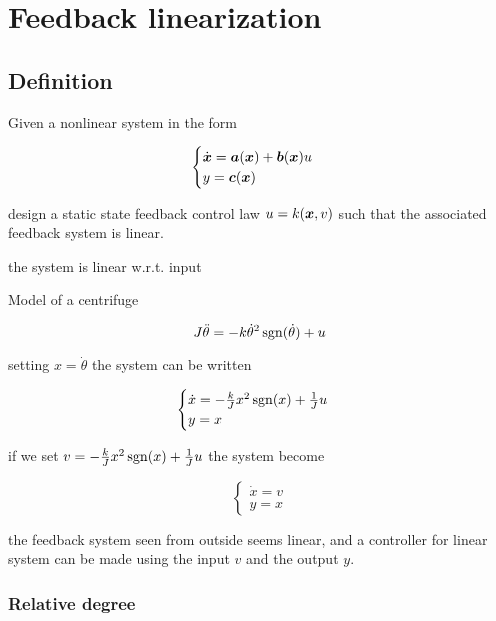 \usepackage{amsmath}\usepackage{amsmath}\chapter{Feedback linearization}

\section{Definition}

Given a nonlinear system in the form

\[
    \begin{cases}
        \dot{\boldsymbol{x}} =\boldsymbol{a}(\boldsymbol{x}) + \boldsymbol{b}(\boldsymbol{x}) u \\
        y = \boldsymbol{c}(\boldsymbol{x})
    \end{cases}
\]

design a static state feedback control law $u = k(\boldsymbol{x},v)$ such that the associated feedback system is linear.

\begin{nb} the system is linear w.r.t. input \end{nb}

\begin{example}
    Model of a centrifuge

    \[
        J \ddot\theta = -k \dot \theta^2 \operatorname{sgn}(\dot \theta) + u
    \]

    setting $x = \dot\theta$ the system can be written

    \[
    \begin{cases}
        \dot x = - \frac{k}{J} x^2 \operatorname{sgn}(x) + \frac{1}{J} u \\
        y = x
    \end{cases}
    \]

    if we set $v = - \frac{k}{J}x^2 \operatorname{sgn}(x) + \frac{1}{J}u$ the system become

    \[
    \begin{cases}
        \dot x = v \\
        y = x
    \end{cases}
    \]

    the feedback system seen from outside seems linear, and a controller for linear system can be made using the input $v$ and the output $y$.
\end{example}

\subsection{Relative degree}


